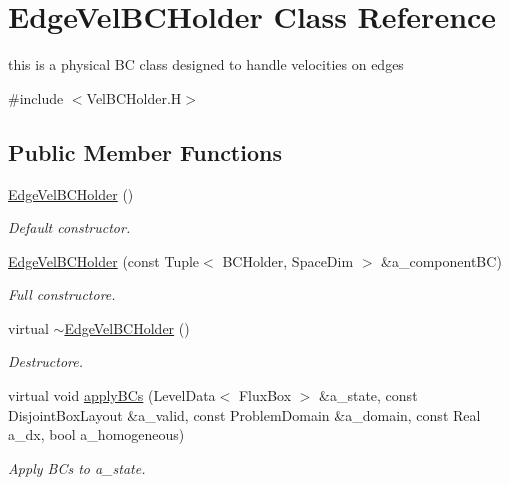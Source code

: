 \hypertarget{class_edge_vel_b_c_holder}{\section{Edge\-Vel\-B\-C\-Holder Class Reference}
\label{class_edge_vel_b_c_holder}
}


this is a physical B\-C class designed to handle velocities on edges  




{\ttfamily \#include $<$Vel\-B\-C\-Holder.\-H$>$}

\subsection*{Public Member Functions}
\begin{DoxyCompactItemize}
\item 
\hypertarget{class_edge_vel_b_c_holder_aa2b8fa8269461af0855bfb1730868b15}{\hyperlink{class_edge_vel_b_c_holder_aa2b8fa8269461af0855bfb1730868b15}{Edge\-Vel\-B\-C\-Holder} ()}\label{class_edge_vel_b_c_holder_aa2b8fa8269461af0855bfb1730868b15}

\begin{DoxyCompactList}\small\item\em Default constructor. \end{DoxyCompactList}\item 
\hypertarget{class_edge_vel_b_c_holder_acf8f3b7abd18f5d2ebbeb652fc9350ee}{\hyperlink{class_edge_vel_b_c_holder_acf8f3b7abd18f5d2ebbeb652fc9350ee}{Edge\-Vel\-B\-C\-Holder} (const Tuple$<$ B\-C\-Holder, Space\-Dim $>$ \&a\-\_\-component\-B\-C)}\label{class_edge_vel_b_c_holder_acf8f3b7abd18f5d2ebbeb652fc9350ee}

\begin{DoxyCompactList}\small\item\em Full constructore. \end{DoxyCompactList}\item 
\hypertarget{class_edge_vel_b_c_holder_aa39ae49946806857b8136aea31e3f4ce}{virtual \hyperlink{class_edge_vel_b_c_holder_aa39ae49946806857b8136aea31e3f4ce}{$\sim$\-Edge\-Vel\-B\-C\-Holder} ()}\label{class_edge_vel_b_c_holder_aa39ae49946806857b8136aea31e3f4ce}

\begin{DoxyCompactList}\small\item\em Destructore. \end{DoxyCompactList}\item 
\hypertarget{class_edge_vel_b_c_holder_a9e4f58cb58cbefa89c76e8f2c5edc404}{virtual void \hyperlink{class_edge_vel_b_c_holder_a9e4f58cb58cbefa89c76e8f2c5edc404}{apply\-B\-Cs} (Level\-Data$<$ Flux\-Box $>$ \&a\-\_\-state, const Disjoint\-Box\-Layout \&a\-\_\-valid, const Problem\-Domain \&a\-\_\-domain, const Real a\-\_\-dx, bool a\-\_\-homogeneous)}\label{class_edge_vel_b_c_holder_a9e4f58cb58cbefa89c76e8f2c5edc404}

\begin{DoxyCompactList}\small\item\em Apply B\-Cs to a\-\_\-state. \end{DoxyCompactList}\end{DoxyCompactItemize}
